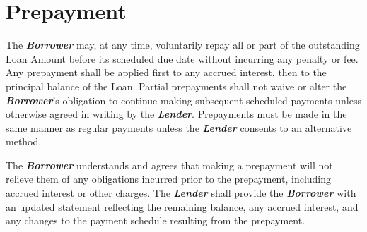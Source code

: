 
\section{Prepayment}
\label{sec:prepayment}

The \textbf{\textit{Borrower}} may, at any time, voluntarily repay all or part of the outstanding Loan Amount before its scheduled due date without incurring any penalty or fee. Any prepayment shall be applied first to any accrued interest, then to the principal balance of the Loan. Partial prepayments shall not waive or alter the \textbf{\textit{Borrower}}’s obligation to continue making subsequent scheduled payments unless otherwise agreed in writing by the \textbf{\textit{Lender}}. Prepayments must be made in the same manner as regular payments unless the \textbf{\textit{Lender}} consents to an alternative method.

\vspace{0.3cm}

\noindent The \textbf{\textit{Borrower}} understands and agrees that making a prepayment will not relieve them of any obligations incurred prior to the prepayment, including accrued interest or other charges. The \textbf{\textit{Lender}} shall provide the \textbf{\textit{Borrower}} with an updated statement reflecting the remaining balance, any accrued interest, and any changes to the payment schedule resulting from the prepayment.


